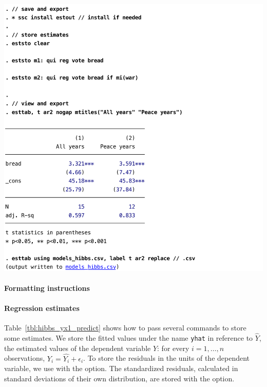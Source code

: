 \begin{table}[htp]
	\includegraphics[scale=.5]{images/hibbs_yx1_estout.pdf}

	\caption[Storing estimates with ]{\label{tbl:hibbs_yx1_estout}%
    Storing and exporting estimates with . %
	  See  and related online documentation for options. %
    \emph{Note:} the  command is muted by the  command in this code; %
    its output does not show up on screen, but the command ran `silently' in the background. %
    \hibbs}
\end{table}%

\paragraph{Formatting instructions}

%
%
%
\paragraph{Regression estimates}

Table~\ref{tbl:hibbs_yx1_predict} shows how to pass several  commands to store some estimates. We store the fitted values under the name \texttt{yhat} in reference to $\hat{Y}$, the estimated values of the dependent variable $Y$: for every $i=1, \ldots, n$ observations, $Y_i = \hat{Y_i} + \epsilon_i$. To store the residuals in the units of the dependent variable, we use  with the  option. The standardized residuals, calculated in standard deviations of their own distribution, are stored with the  option.

